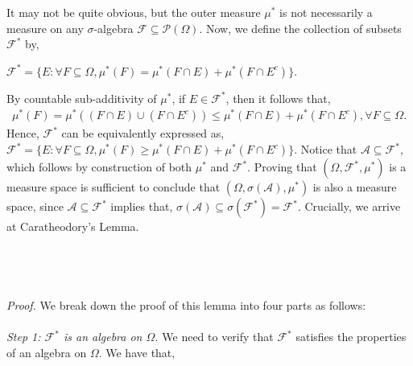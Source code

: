 \documentclass{article}
\begin{document}
It may not be quite obvious, but the outer measure $\mu^{*}$ is not necessarily a measure on any $\sigma$-algebra $\mathcal{F} \subseteq \mathcal{P}(\Omega)$. Now, we define the collection of subsets $\mathcal{F}^{*}$ by,
\begin{center}
	$\mathcal{F}^{*} = \{E: \forall F \subseteq \Omega, \mu^{*}(F) = \mu^{*}(F \cap E) + \mu^{*}(F \cap E^c)\}$.
\end{center}
By countable sub-additivity of $\mu^{*}$, if $E \in \mathcal{F}^{*}$, then it follows that,
\begin{eqnarray}
\nonumber
\mu^{*}(F) = \mu^{*}((F \cap E) \cup (F \cap E^c)) \leq \mu^{*}(F \cap E) + \mu^{*}(F \cap E^c), \forall F \subseteq \Omega.
\end{eqnarray}
Hence, $\mathcal{F}^{*}$ can be equivalently expressed as, $\mathcal{F}^{*} = \{E: \forall F \subseteq \Omega, \mu^{*}(F) \geq \mu^{*}(F \cap E) + \mu^{*}(F \cap E^c)\}$. Notice that $\mathcal{A} \subseteq \mathcal{F}^{*}$, which follows by construction of both $\mu^{*}$ and $\mathcal{F}^{*}$. Proving that $(\Omega, \mathcal{F}^{*}, \mu^{*})$ is a measure space is sufficient to conclude that $(\Omega, \sigma(\mathcal{A}), \mu^{*})$ is also a measure space, since $\mathcal{A} \subseteq \mathcal{F}^{*}$ implies that, $\sigma(\mathcal{A}) \subseteq \sigma(\mathcal{F}^{*}) = \mathcal{F}^{*}$. Crucially, we arrive at Caratheodory's Lemma.\\\\
\noindent{}\\\\\\
\textit{Proof.} We break down the proof of this lemma into four parts as follows: \\\\
\textit{Step 1: $\mathcal{F}^{*}$ is an algebra on $\Omega$.} We need to verify that $\mathcal{F}^{*}$ satisfies the properties of an algebra on $\Omega$. We have that,
\end{document}

